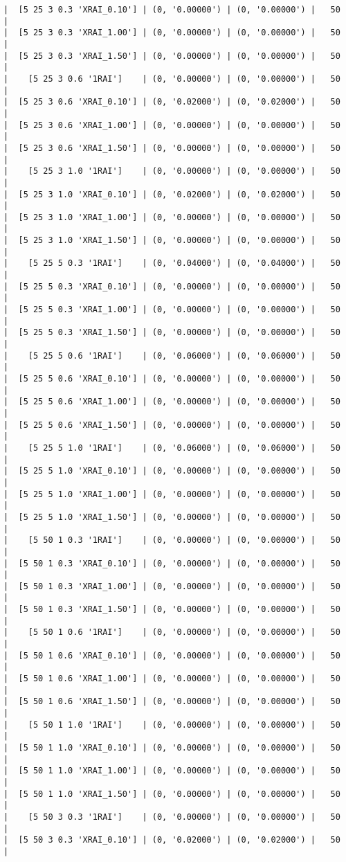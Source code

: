 \documentclass{article}
\begin{document}
\begin{verbatim}
|  [5 25 3 0.3 'XRAI_0.10'] | (0, '0.00000') | (0, '0.00000') |   50  |
|  [5 25 3 0.3 'XRAI_1.00'] | (0, '0.00000') | (0, '0.00000') |   50  |
|  [5 25 3 0.3 'XRAI_1.50'] | (0, '0.00000') | (0, '0.00000') |   50  |
|    [5 25 3 0.6 '1RAI']    | (0, '0.00000') | (0, '0.00000') |   50  |
|  [5 25 3 0.6 'XRAI_0.10'] | (0, '0.02000') | (0, '0.02000') |   50  |
|  [5 25 3 0.6 'XRAI_1.00'] | (0, '0.00000') | (0, '0.00000') |   50  |
|  [5 25 3 0.6 'XRAI_1.50'] | (0, '0.00000') | (0, '0.00000') |   50  |
|    [5 25 3 1.0 '1RAI']    | (0, '0.00000') | (0, '0.00000') |   50  |
|  [5 25 3 1.0 'XRAI_0.10'] | (0, '0.02000') | (0, '0.02000') |   50  |
|  [5 25 3 1.0 'XRAI_1.00'] | (0, '0.00000') | (0, '0.00000') |   50  |
|  [5 25 3 1.0 'XRAI_1.50'] | (0, '0.00000') | (0, '0.00000') |   50  |
|    [5 25 5 0.3 '1RAI']    | (0, '0.04000') | (0, '0.04000') |   50  |
|  [5 25 5 0.3 'XRAI_0.10'] | (0, '0.00000') | (0, '0.00000') |   50  |
|  [5 25 5 0.3 'XRAI_1.00'] | (0, '0.00000') | (0, '0.00000') |   50  |
|  [5 25 5 0.3 'XRAI_1.50'] | (0, '0.00000') | (0, '0.00000') |   50  |
|    [5 25 5 0.6 '1RAI']    | (0, '0.06000') | (0, '0.06000') |   50  |
|  [5 25 5 0.6 'XRAI_0.10'] | (0, '0.00000') | (0, '0.00000') |   50  |
|  [5 25 5 0.6 'XRAI_1.00'] | (0, '0.00000') | (0, '0.00000') |   50  |
|  [5 25 5 0.6 'XRAI_1.50'] | (0, '0.00000') | (0, '0.00000') |   50  |
|    [5 25 5 1.0 '1RAI']    | (0, '0.06000') | (0, '0.06000') |   50  |
|  [5 25 5 1.0 'XRAI_0.10'] | (0, '0.00000') | (0, '0.00000') |   50  |
|  [5 25 5 1.0 'XRAI_1.00'] | (0, '0.00000') | (0, '0.00000') |   50  |
|  [5 25 5 1.0 'XRAI_1.50'] | (0, '0.00000') | (0, '0.00000') |   50  |
|    [5 50 1 0.3 '1RAI']    | (0, '0.00000') | (0, '0.00000') |   50  |
|  [5 50 1 0.3 'XRAI_0.10'] | (0, '0.00000') | (0, '0.00000') |   50  |
|  [5 50 1 0.3 'XRAI_1.00'] | (0, '0.00000') | (0, '0.00000') |   50  |
|  [5 50 1 0.3 'XRAI_1.50'] | (0, '0.00000') | (0, '0.00000') |   50  |
|    [5 50 1 0.6 '1RAI']    | (0, '0.00000') | (0, '0.00000') |   50  |
|  [5 50 1 0.6 'XRAI_0.10'] | (0, '0.00000') | (0, '0.00000') |   50  |
|  [5 50 1 0.6 'XRAI_1.00'] | (0, '0.00000') | (0, '0.00000') |   50  |
|  [5 50 1 0.6 'XRAI_1.50'] | (0, '0.00000') | (0, '0.00000') |   50  |
|    [5 50 1 1.0 '1RAI']    | (0, '0.00000') | (0, '0.00000') |   50  |
|  [5 50 1 1.0 'XRAI_0.10'] | (0, '0.00000') | (0, '0.00000') |   50  |
|  [5 50 1 1.0 'XRAI_1.00'] | (0, '0.00000') | (0, '0.00000') |   50  |
|  [5 50 1 1.0 'XRAI_1.50'] | (0, '0.00000') | (0, '0.00000') |   50  |
|    [5 50 3 0.3 '1RAI']    | (0, '0.00000') | (0, '0.00000') |   50  |
|  [5 50 3 0.3 'XRAI_0.10'] | (0, '0.02000') | (0, '0.02000') |   50  |

\end{verbatim}
\end{document}
